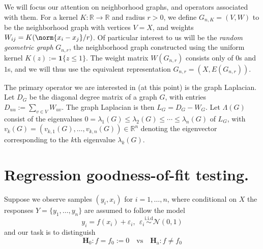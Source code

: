 \documentclass{article}
\newcommand{\Reals}{\mathbb{R}}
\newcommand{\1}{\mathbf{1}}
\theoremstyle{alden}
\theoremstyle{aldenthm}
\theoremstyle{definition}
\theoremstyle{remark}
\begin{document}
We will focus our attention on neighborhood graphs, and operators associated with them. For a kernel $K:\Reals \to \Reals$ and radius $r > 0$, we define $G_{n,K}=(V,W)$ to be the neighborhood graph with vertices $V = X$, and weights $W_{ij} = K(\norm{x_i - x_j}/r)$. Of particular interest to us will be the \emph{random geometric graph} $G_{n,r}$, the neighborhood graph constructed using the uniform kernel $K(z) := \1\{z \leq 1\}$. The weight matrix $W(G_{n,r})$ consists only of $0$s and $1$s, and we will thus use the equivalent representation $G_{n,r} = (X,E(G_{n,r}))$.

The primary operator we are interested in (at this point) is the graph Laplacian. Let $D_G$ be the diagonal degree
matrix of a graph $G$, with entries $D_{uu} := \sum_{v \in V} W_{uv}$. The graph Laplacian is then $L_G = D_G - W_G$. Let $\Lambda(G)$ consist of the eigenvalues $0 = \lambda_1(G) \leq \lambda_2(G) \leq \cdots \leq \lambda_n(G)$ of $L_G$, with $v_k(G) = (v_{k,1}(G),\ldots,v_{k,n}(G)) \in \Reals^n$ denoting the eigenvector corresponding to the $k$th eigenvalue $\lambda_k(G)$.  

\section{Regression goodness-of-fit testing.}

Suppose we observe samples $(y_i,x_i)$ for $i = 1,\ldots,n$, where conditional on $X$ the responses $Y = \{y_1,\ldots,y_n\}$ are assumed to follow the model
\begin{equation}
\label{eqn:regression_known_variance}
y_i = f(x_i) + \varepsilon_i, ~~ \varepsilon_i \overset{\textrm{i.i.d}}{\sim} \mathcal{N}(0,1)
\end{equation} 
and our task is to distinguish
\begin{equation*}
\mathbf{H}_0: f = f_0 := 0 \quad \textrm{vs} \quad \mathbf{H}_{\textrm{a}}: f \neq f_0
\end{equation*}
\end{document}
